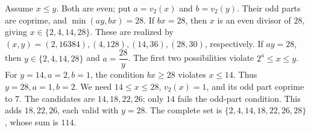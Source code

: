 Assume $x\le y$. Both are even; put $a=v_2(x)$ and $b=v_2(y)$. Their odd parts are coprime, and $\min(ay,bx)=28$. If $bx=28$, then $x$ is an even divisor of $28$, giving $x\in\{2,4,14,28\}$. These are realized by $(x,y)=(2,16384),(4,128),(14,36),(28,30)$, respectively. If $ay=28$, then $y\in\{2,4,14,28\}$ and $a=\dfrac{28}{y}$. The first two possibilities violate $2^a\le x\le y$. For $y=14,a=2,b=1$, the condition $bx\ge28$ violates $x\le14$. Thus $y=28,a=1,b=2$. We need $14\le x\le28$, $v_2(x)=1$, and its odd part coprime to $7$. The candidates are $14,18,22,26$; only $14$ fails the odd-part condition. This adds $18,22,26$, each valid with $y=28$. The complete set is $\{2,4,14,18,22,26,28\}$, whose sum is $\boxed{114}$.
